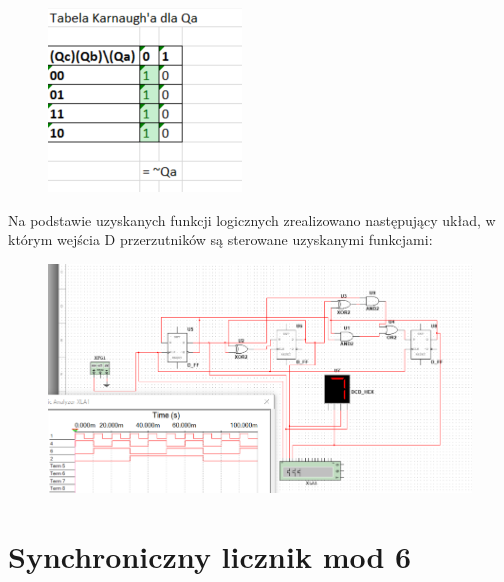 \documentclass[12pt,a4paper]{article}
\begin{document}
\begin{figure}[H]
\centering
\includegraphics{img/4c_table_qa}
\end{figure}

Na podstawie uzyskanych funkcji logicznych zrealizowano następujący układ, w którym wejścia D przerzutników są sterowane uzyskanymi funkcjami:


\begin{figure}[H]
\centering
\includegraphics[width=\textwidth]{img/4c}
\end{figure}



\section{Synchroniczny licznik mod 6}
\end{document}
